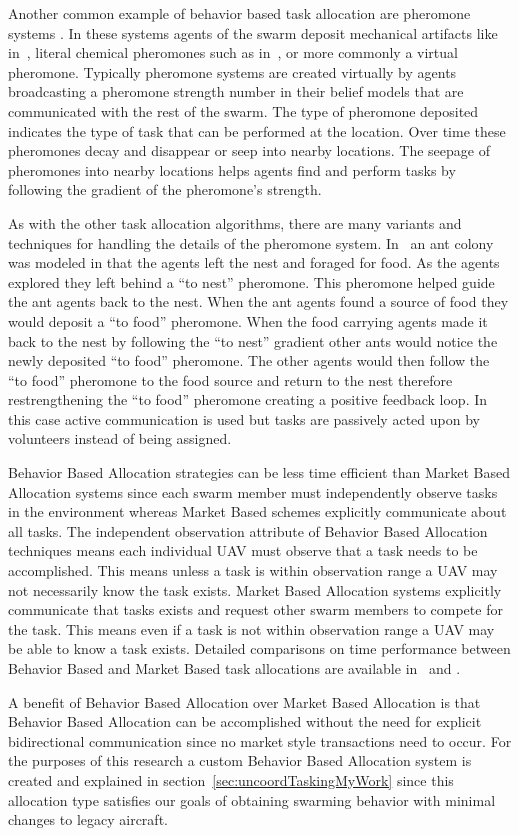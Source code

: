 Another common example of behavior based task allocation are pheromone systems \parencite{p2p_pheromone, manet_pheromone}.  In these systems agents of the swarm deposit mechanical artifacts like in~\textcite{beacon_pheromone}, literal chemical pheromones such as in~\textcite{ethanol_swarm}, or more commonly a virtual pheromone.  Typically pheromone systems are created virtually by agents broadcasting a pheromone strength number in their belief models that are communicated with the rest of the swarm. The type of pheromone deposited indicates the type of task that can be performed at the location.  Over time these pheromones decay and disappear or seep into nearby locations.  The seepage of pheromones into nearby locations helps agents find and perform tasks by following the gradient of the pheromone's strength.

As with the other task allocation algorithms, there are many variants and techniques for handling the details of the pheromone system.  In~\textcite{pheromone} an ant colony was modeled in that the agents left the nest and foraged for food.  As the agents explored they left behind a ``to nest'' pheromone.  This pheromone helped guide the ant agents back to the nest.  When the ant agents found a source of food they would deposit a ``to food'' pheromone.  When the food carrying agents made it back to the nest by following the ``to nest'' gradient other ants would notice the newly deposited ``to food'' pheromone.  The other agents would then follow the ``to food'' pheromone to the food source and return to the nest therefore restrengthening the ``to food'' pheromone creating a positive feedback loop.  In this case active communication is used but tasks are passively acted upon by volunteers instead of being assigned.

Behavior Based Allocation strategies can be less time efficient than Market Based Allocation systems since each swarm member must independently observe tasks in the environment whereas Market Based schemes explicitly communicate about all tasks.  The independent observation attribute of Behavior Based Allocation techniques means each individual UAV must observe that a task needs to be accomplished.  This means unless a task is within observation range a UAV may not necessarily know the task exists.  Market Based Allocation systems explicitly communicate that tasks exists and request other swarm members to compete for the task.  This means even if a task is not within observation range a UAV may be able to know a task exists.  Detailed comparisons on time performance between Behavior Based and Market Based task allocations are available in~\textcite{bba_vs_mba_1} and \textcite{bba_vs_mba_2}.

A benefit of Behavior Based Allocation over Market Based Allocation is that Behavior Based Allocation can be accomplished without the need for explicit bidirectional communication since no market style transactions need to occur.  For the purposes of this research a custom Behavior Based Allocation system is created and explained in section~\ref{sec:uncoordTaskingMyWork} since this allocation type satisfies our goals of obtaining swarming behavior with minimal changes to legacy aircraft.